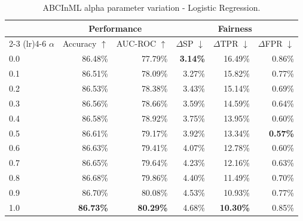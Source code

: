 \begin{table}
  \caption{ABCInML alpha parameter variation - Logistic Regression.}
  \label{tab:alpha-lr}
  \begin{tabular}{lrrrrr}
    \toprule
     & \multicolumn{2}{c}{Performance} & \multicolumn{3}{c}{Fairness} \\
    \cmidrule(lr){2-3} \cmidrule(lr){4-6}
    $\alpha$ & Accuracy $\uparrow$ & AUC-ROC $\uparrow$ & $\Delta$SP $\downarrow$ & $\Delta$TPR $\downarrow$ & $\Delta$FPR $\downarrow$ \\
    \midrule
    0.0 & 86.48\% & 77.79\% & \textbf{3.14\%} & 16.49\% & 0.86\% \\
    0.1 & 86.51\% & 78.09\% & 3.27\% & 15.82\% & 0.77\% \\
    0.2 & 86.53\% & 78.38\% & 3.43\% & 15.14\% & 0.69\% \\
    0.3 & 86.56\% & 78.66\% & 3.59\% & 14.59\% & 0.64\% \\
    0.4 & 86.58\% & 78.92\% & 3.75\% & 13.95\% & 0.60\% \\
    0.5 & 86.61\% & 79.17\% & 3.92\% & 13.34\% & \textbf{0.57\%} \\
    0.6 & 86.63\% & 79.41\% & 4.07\% & 12.78\% & 0.60\% \\
    0.7 & 86.65\% & 79.64\% & 4.23\% & 12.16\% & 0.63\% \\
    0.8 & 86.68\% & 79.86\% & 4.40\% & 11.49\% & 0.70\% \\
    0.9 & 86.70\% & 80.08\% & 4.53\% & 10.93\% & 0.77\% \\
    1.0 & \textbf{86.73\%} & \textbf{80.29\%} & 4.68\% & \textbf{10.30\%} & 0.85\% \\
    \bottomrule
  \end{tabular}
\end{table}

